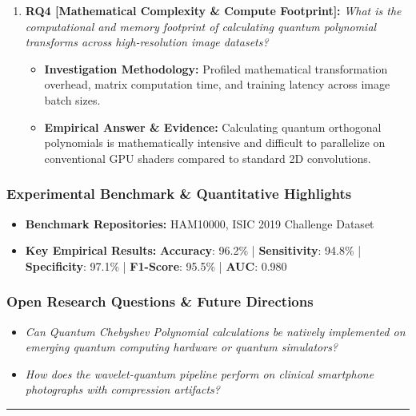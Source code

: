 \begin{enumerate}[label=\textbf{\arabic*.}, leftmargin=*]
\begin{itemize}[leftmargin=1.5em]
    \item \textbf{Empirical Answer \& Evidence:} Achieved an outstanding ROC-AUC of 0.980, significantly outperforming standard spatial CNNs and conventional wavelet moments.
  \end{itemize}
  \item \textbf{RQ4 [Mathematical Complexity \& Compute Footprint]:} \textit{What is the computational and memory footprint of calculating quantum polynomial transforms across high-resolution image datasets?}
  \begin{itemize}[leftmargin=1.5em]
    \item \textbf{Investigation Methodology:} Profiled mathematical transformation overhead, matrix computation time, and training latency across image batch sizes.
    \item \textbf{Empirical Answer \& Evidence:} Calculating quantum orthogonal polynomials is mathematically intensive and difficult to parallelize on conventional GPU shaders compared to standard 2D convolutions.
  \end{itemize}
\end{enumerate}

\subsubsection*{Experimental Benchmark \& Quantitative Highlights}
\begin{itemize}[leftmargin=*]
  \item \textbf{Benchmark Repositories:} HAM10000, ISIC 2019 Challenge Dataset
  \item \textbf{Key Empirical Results:} \textbf{Accuracy}: 96.2\% \quad | \quad \textbf{Sensitivity}: 94.8\% \quad | \quad \textbf{Specificity}: 97.1\% \quad | \quad \textbf{F1-Score}: 95.5\% \quad | \quad \textbf{AUC}: 0.980
\end{itemize}

\subsubsection*{Open Research Questions \& Future Directions}
\begin{itemize}[leftmargin=*]
  \item \textit{Can Quantum Chebyshev Polynomial calculations be natively implemented on emerging quantum computing hardware or quantum simulators?}
  \item \textit{How does the wavelet-quantum pipeline perform on clinical smartphone photographs with compression artifacts?}
\end{itemize}
\vspace{0.8em}\hrule\vspace{1.2em}
